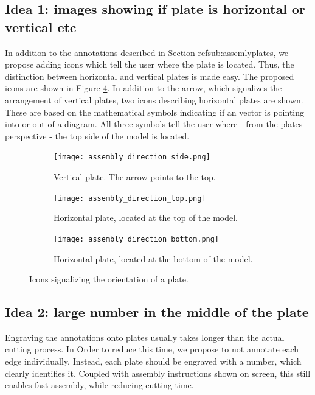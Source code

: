 \documentclass[../ClassicThesis.tex]{subfiles}
\begin{document}
\subsection{Idea 1: images showing if plate is horizontal or vertical etc}

In addition to the annotations described in Section ref{sub:assemlyplates}, we propose adding icons which tell the user where the plate is located. Thus, the distinction between horizontal and vertical plates is made easy. The proposed icons are shown in Figure \ref{fig:assemblyicons}. In addition to the arrow, which signalizes the arrangement of vertical plates, two icons describing horizontal plates are shown. These are based on the mathematical symbols indicating if an vector is pointing into or out of a diagram. All three symbols tell the user where - from the plates perspective - the top side of the model is located. 

\begin{figure}
  \centering
  \begin{subfigure}[b]{0.3\textwidth}
    \centering
    \texttt{[image: assembly\_direction\_side.png]}
    \caption{Vertical plate. The arrow points to the top.}
    \label{fig:assemblyicons:side}
  \end{subfigure}
  \begin{subfigure}[b]{0.3\textwidth}
    \centering
    \texttt{[image: assembly\_direction\_top.png]}
    \caption{Horizontal plate, located at the top of the model.}
    \label{fig:assemblyicons:top}
  \end{subfigure}
  \begin{subfigure}[b]{0.3\textwidth}
    \centering
    \texttt{[image: assembly\_direction\_bottom.png]}
    \caption{Horizontal plate, located at the bottom of the model.}
    \label{fig:assemblyicons:bottom}
  \end{subfigure}
  \caption{Icons signalizing the orientation of a plate.}
  \label{fig:assemblyicons}
\end{figure}

\subsection{Idea 2: large number in the middle of the plate}

Engraving the annotations onto plates usually takes longer than the actual cutting process. In Order to reduce this time, we propose to not annotate each edge individually. Instead, each plate should be engraved with a number, which clearly identifies it. Coupled with assembly instructions shown on screen, this still enables fast assembly, while reducing cutting time.
\end{document}
